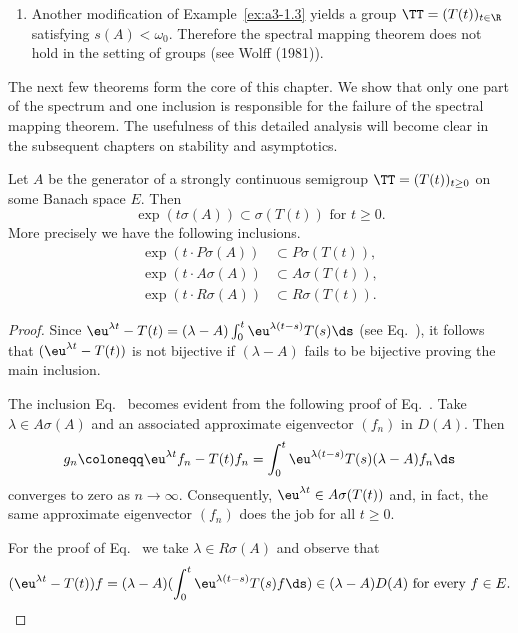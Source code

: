 \begin{example}
\begin{enumerate}[\upshape (i), wide, labelindent=.25em]
\item 
Another modification of Example~\ref{ex:a3-1.3} yields a group $\TT = (T(t))_{t \in \R}$ satisfying $s(A) < \omega_{0}$.
Therefore the spectral mapping theorem does not hold in the setting of groups (see Wolff (1981)).
\end{enumerate}
\end{example}
The next few theorems form the core of this chapter. 
We show that only one part of the spectrum and one inclusion is responsible for the failure of the spectral mapping theorem.
The usefulness of this detailed analysis will become clear in the subsequent chapters on stability and asymptotics.
\begin{proposition}
\label{prop:a3-6.2}%
Let $A$ be the generator of a strongly continuous semigroup $\TT = (T(t))_{t \geq 0}$ on some Banach space $E$.
Then
\[
\exp(t\sigma(A)) \subset \sigma(T(t)) \text{ for } t \geq 0 .
\]
More precisely we have the following inclusions.
\begin{align}
\exp(t \cdot P\sigma(A)) &\subset P\sigma(T(t)) \label{eq:a3-6.1} , \\
\exp(t \cdot A\sigma(A)) &\subset A\sigma(T(t)) \label{eq:a3-6.2} , \\
\exp(t \cdot R\sigma(A)) &\subset R\sigma(T(t)) \label{eq:a3-6.3} .
\end{align}
\end{proposition}
\begin{proof}
Since $\eu^{\lambda t} - T(t) = (\lambda - A)\int_{0}^{t} \eu^{\lambda(t-s)}T(s) \ds$ (see Eq.~), it follows that $(\eu^{\lambda t} - T(t))$ is not bijective if\/ $(\lambda - A)$ fails to be bijective proving the main inclusion.

The inclusion Eq.~ becomes evident from the following proof of Eq.~. Take $\lambda \in A\sigma(A)$ and an associated approximate eigenvector $(f_{n})$ in $D(A)$.
Then
\[%
g_{n} \coloneqq \eu^{\lambda t}f_{n} - T(t)f_{n} = \int_{0}^{t} \eu^{\lambda(t-s)}T(s)(\lambda-A)f_{n} \ds
\]
converges to zero as $n \to \infty$.
Consequently, $\eu^{\lambda t} \in A\sigma(T(t))$ and, in fact, the same approximate eigenvector $(f_{n})$ does the job for all $t \geq 0$.

For the proof of Eq.~ we take $\lambda \in R\sigma(A)$ and observe that 
\[%
(\eu^{\lambda t} - T(t))f = (\lambda - A)(\int_{0}^{t} \eu^{\lambda(t-s)}T(s)f \ds) \in (\lambda - A)D(A) \text{ for every } f \in E.
\qedhere
\]
\end{proof}
